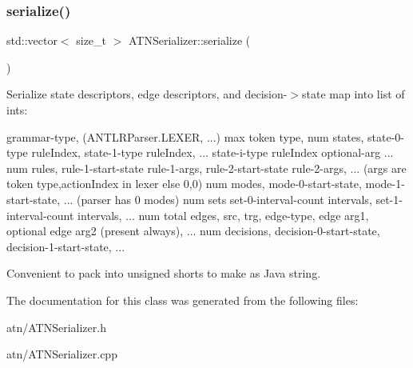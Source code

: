 \subsubsection{\texorpdfstring{serialize()}{serialize()}}
{\footnotesize\ttfamily std\+::vector$<$ size\+\_\+t $>$ A\+T\+N\+Serializer\+::serialize (\begin{DoxyParamCaption}{ }\end{DoxyParamCaption})\hspace{0.3cm}{\ttfamily [virtual]}}



Serialize state descriptors, edge descriptors, and decision-\/$>$state map into list of ints\+: 

grammar-\/type, (A\+N\+T\+L\+R\+Parser.\+L\+E\+X\+ER, ...) max token type, num states, state-\/0-\/type rule\+Index, state-\/1-\/type rule\+Index, ... state-\/i-\/type rule\+Index optional-\/arg ... num rules, rule-\/1-\/start-\/state rule-\/1-\/args, rule-\/2-\/start-\/state rule-\/2-\/args, ... (args are token type,action\+Index in lexer else 0,0) num modes, mode-\/0-\/start-\/state, mode-\/1-\/start-\/state, ... (parser has 0 modes) num sets set-\/0-\/interval-\/count intervals, set-\/1-\/interval-\/count intervals, ... num total edges, src, trg, edge-\/type, edge arg1, optional edge arg2 (present always), ... num decisions, decision-\/0-\/start-\/state, decision-\/1-\/start-\/state, ...

Convenient to pack into unsigned shorts to make as Java string. 

The documentation for this class was generated from the following files\+:\begin{DoxyCompactItemize}
\item 
atn/A\+T\+N\+Serializer.\+h\item 
atn/A\+T\+N\+Serializer.\+cpp\end{DoxyCompactItemize}
